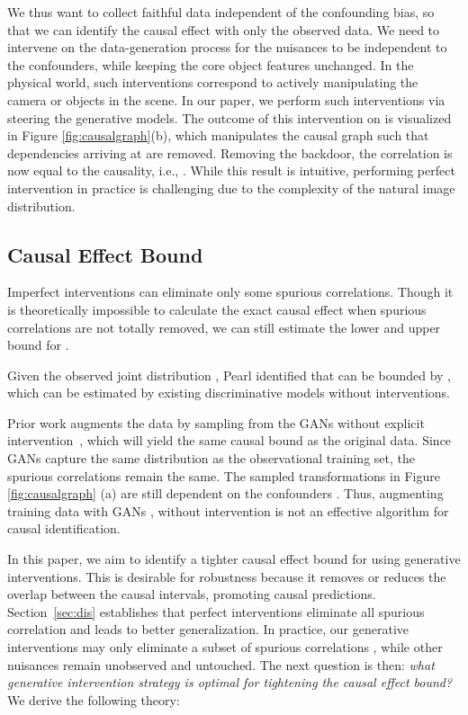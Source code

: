 \documentclass[final]{cvpr}
\begin{document}
We thus want to collect faithful data independent of the confounding bias, so that we can identify the causal effect with only the observed data. We need to intervene on the data-generation process for the nuisances  to be independent to the confounders, while keeping the core object features  unchanged. In the physical world, such interventions correspond to actively manipulating the camera or objects in the scene. In our paper, we perform such interventions via steering the generative models. The outcome of this intervention on  is visualized in Figure \ref{fig:causalgraph}(b), which manipulates the causal graph such that dependencies arriving at  are removed. Removing the backdoor, the correlation is now equal to the causality, i.e.,  . While this result is intuitive, performing perfect intervention in practice is challenging due to the complexity of the natural image distribution. 




\subsection{Causal Effect Bound}
Imperfect interventions can eliminate only some spurious correlations. Though it is theoretically impossible to calculate the exact causal effect  when spurious correlations are not totally removed, we can still estimate the lower and upper bound for .

 Given the observed joint distribution , Pearl \cite{pearl} identified that  can be bounded by , which can be estimated by existing discriminative models without interventions. 
 
 Prior work augments the data by sampling from the GANs without explicit intervention~\cite{lowshotgan, antoniou2017gandataaug, GANaug, GanLiver}, which will yield the same causal bound as the original data. Since GANs capture the same distribution as the observational training set, the spurious correlations remain the same. The sampled transformations  in Figure \ref{fig:causalgraph} (a) are still dependent on the confounders . Thus, augmenting training data with GANs \cite{CAS}, without intervention is not an effective algorithm for causal identification. 

In this paper, we aim to identify a tighter causal effect bound for  using generative interventions. This is desirable for robustness because it removes or reduces the overlap between the causal intervals, promoting causal predictions. 
Section~\ref{sec:dis} establishes that perfect interventions eliminate all spurious correlation and leads to better generalization. In practice, our generative interventions may only eliminate a subset of spurious correlations  , while other nuisances  remain unobserved and untouched. The next question is then: \emph{what generative intervention strategy is optimal for tightening the causal effect bound?} We derive the following theory:
\end{document}
